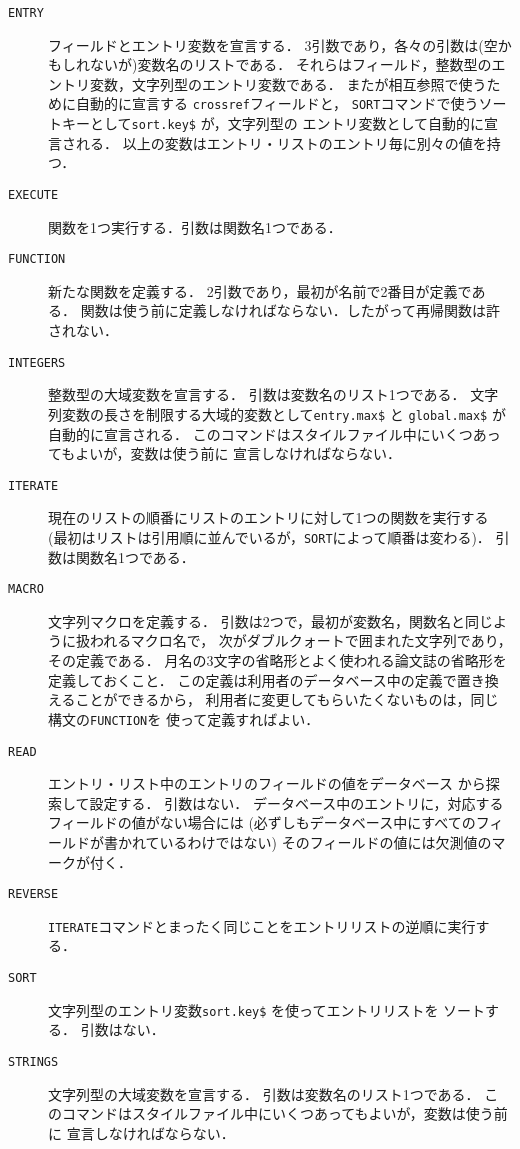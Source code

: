\begin{description}

\item[\hbox{\tt ENTRY}\hfill]
フィールドとエントリ変数を宣言する．
3引数であり，各々の引数は(空かもしれないが)変数名のリストである．
それらはフィールド，整数型のエントリ変数，文字列型のエントリ変数である．
また\BibTeX が相互参照で使うために自動的に宣言する
{\tt crossref}フィールドと，
{\tt SORT}コマンドで使うソートキーとして{\tt sort.key\$} が，文字列型の
エントリ変数として自動的に宣言される．
以上の変数はエントリ・リストのエントリ毎に別々の値を持つ．

\item[\hbox{\tt EXECUTE}\hfill]
関数を1つ実行する．引数は関数名1つである．

\item[\hbox{\tt FUNCTION}\hfill]
新たな関数を定義する．
2引数であり，最初が名前で2番目が定義である．
関数は使う前に定義しなければならない．したがって再帰関数は許されない．

\item[\hbox{\tt INTEGERS}\hfill]
整数型の大域変数を宣言する．
引数は変数名のリスト1つである．
文字列変数の長さを制限する大域的変数として{\tt entry.max\$} と
{\tt global.max\$} が自動的に宣言される．
このコマンドはスタイルファイル中にいくつあってもよいが，変数は使う前に
宣言しなければならない．

\item[\hbox{\tt ITERATE}\hfill]
現在のリストの順番にリストのエントリに対して1つの関数を実行する
(最初はリストは引用順に並んでいるが，{\tt SORT}によって順番は変わる)．
引数は関数名1つである．

\item[\hbox{\tt MACRO}\hfill]
文字列マクロを定義する．
引数は2つで，最初が変数名，関数名と同じように扱われるマクロ名で，
次がダブルクォートで囲まれた文字列であり，その定義である．
月名の3文字の省略形とよく使われる論文誌の省略形を定義しておくこと．
この定義は利用者のデータベース中の定義で置き換えることができるから，
利用者に変更してもらいたくないものは，同じ構文の{\tt FUNCTION}を
使って定義すればよい．

\item[\hbox{\tt READ}\hfill]
エントリ・リスト中のエントリのフィールドの値をデータベース
から探索して設定する．
引数はない．
データベース中のエントリに，対応するフィールドの値がない場合には
(必ずしもデータベース中にすべてのフィールドが書かれているわけではない)
そのフィールドの値には欠測値のマークが付く．

\item[\hbox{\tt REVERSE}\hfill]
{\tt ITERATE}コマンドとまったく同じことをエントリリストの逆順に実行する．

\item[\hbox{\tt SORT}\hfill]
文字列型のエントリ変数{\tt sort.key\$} を使ってエントリリストを
ソートする．
引数はない．

\item[\hbox{\tt STRINGS}\hfill]
文字列型の大域変数を宣言する．
引数は変数名のリスト1つである．
このコマンドはスタイルファイル中にいくつあってもよいが，変数は使う前に
宣言しなければならない．
\end{description}

